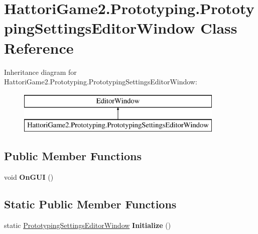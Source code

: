 \hypertarget{class_hattori_game2_1_1_prototyping_1_1_prototyping_settings_editor_window}{}\section{Hattori\+Game2.\+Prototyping.\+Prototyping\+Settings\+Editor\+Window Class Reference}
\label{class_hattori_game2_1_1_prototyping_1_1_prototyping_settings_editor_window}
Inheritance diagram for Hattori\+Game2.\+Prototyping.\+Prototyping\+Settings\+Editor\+Window\+:\begin{figure}[H]
\begin{center}
\leavevmode
\includegraphics[height=2.000000cm]{class_hattori_game2_1_1_prototyping_1_1_prototyping_settings_editor_window}
\end{center}
\end{figure}
\subsection*{Public Member Functions}
\begin{DoxyCompactItemize}
\item 
\hypertarget{class_hattori_game2_1_1_prototyping_1_1_prototyping_settings_editor_window_aa22efe3bd7d23550d458e5a636747929}{}void {\bfseries On\+G\+U\+I} ()\label{class_hattori_game2_1_1_prototyping_1_1_prototyping_settings_editor_window_aa22efe3bd7d23550d458e5a636747929}

\end{DoxyCompactItemize}
\subsection*{Static Public Member Functions}
\begin{DoxyCompactItemize}
\item 
\hypertarget{class_hattori_game2_1_1_prototyping_1_1_prototyping_settings_editor_window_a65c3ea7e5bd11f40ef25d73314d940d6}{}static \hyperlink{class_hattori_game2_1_1_prototyping_1_1_prototyping_settings_editor_window}{Prototyping\+Settings\+Editor\+Window} {\bfseries Initialize} ()\label{class_hattori_game2_1_1_prototyping_1_1_prototyping_settings_editor_window_a65c3ea7e5bd11f40ef25d73314d940d6}

\end{DoxyCompactItemize}
